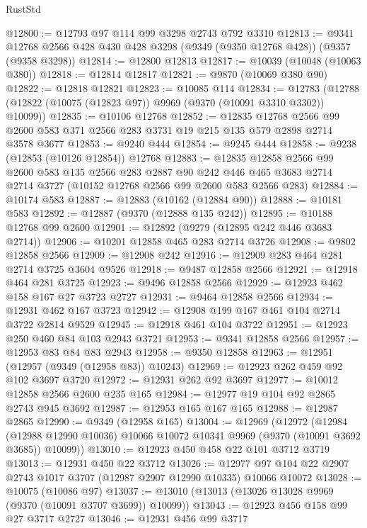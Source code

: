 \begin{lexlean}{RustStd}
\begin{coremodule}
{\begin{coremodule}
{{{{{{{{{{{{{{{{{{{{{{{{{{{{{{{{{{{{{{{@12800 := @12793 @97 @114 @99 @3298 @2743 @792 @3310
@12813 := @9341 @12768 @2566 @428 @430 @428 @3298 (@9349 (@9350 @12768 @428)) (@9357 (@9358 @3298))
@12814 := @12800 @12813
@12817 := @10039 (@10048 (@10063 @380))
@12818 := @12814 @12817
@12821 := @9870 (@10069 @380 @90)
@12822 := @12818 @12821
@12823 := @10085 @114
@12834 := @12783 (@12788 (@12822 (@10075 (@12823 @97)) @9969 (@9370 (@10091 @3310 @3302)) @10099))
@12835 := @10106 @12768
@12852 := @12835
    @12768
    @2566
    @99
    @2600
    @583
    @371
    @2566
    @283
    @3731
    @19
    @215
    @135
    @579
    @2898
    @2714
    @3578
    @3677
@12853 := @9240 @444
@12854 := @9245 @444
@12858 := @9238 (@12853 (@10126 @12854)) @12768
@12883 := @12835
    @12858
    @2566
    @99
    @2600
    @583
    @135
    @2566
    @283
    @2887
    @90
    @242
    @446
    @465
    @3683
    @2714
    @2714
    @3727
    (@10152 @12768 @2566 @99 @2600 @583 @2566 @283)
@12884 := @10174 @583
@12887 := @12883 (@10162 (@12884 @90))
@12888 := @10181 @583
@12892 := @12887 (@9370 (@12888 @135 @242))
@12895 := @10188 @12768 @99 @2600
@12901 := @12892 (@9279 (@12895 @242 @446 @3683 @2714))
@12906 := @10201 @12858 @465 @283 @2714 @3726
@12908 := @9802 @12858 @2566
@12909 := @12908 @242
@12916 := @12909 @283 @464 @281 @2714 @3725 @3604 @9526
@12918 := @9487 @12858 @2566
@12921 := @12918 @464 @281 @3725
@12923 := @9496 @12858 @2566
@12929 := @12923 @462 @158 @167 @27 @3723 @2727
@12931 := @9464 @12858 @2566
@12934 := @12931 @462 @167 @3723
@12942 := @12908 @199 @167 @461 @104 @2714 @3722 @2814 @9529
@12945 := @12918 @461 @104 @3722
@12951 := @12923 @250 @460 @84 @103 @2943 @3721
@12953 := @9341 @12858 @2566
@12957 := @12953 @83 @84 @83 @2943
@12958 := @9350 @12858
@12963 := @12951 (@12957 (@9349 (@12958 @83)) @10243)
@12969 := @12923 @262 @459 @92 @102 @3697 @3720
@12972 := @12931 @262 @92 @3697
@12977 := @10012 @12858 @2566 @2600 @235 @165
@12984 := @12977 @19 @104 @92 @2865 @2743 @945 @3692
@12987 := @12953 @165 @167 @165
@12988 := @12987 @2865
@12990 := @9349 (@12958 @165)
@13004 := @12969
    (@12972
      (@12984
        (@12988 @12990 @10036)
        @10066
        @10072
        @10341
        @9969
        (@9370 (@10091 @3692 @3685))
        @10099))
@13010 := @12923 @450 @458 @22 @101 @3712 @3719
@13013 := @12931 @450 @22 @3712
@13026 := @12977 @97 @104 @22 @2907 @2743 @1017 @3707 (@12987 @2907 @12990 @10335) @10066 @10072
@13028 := @10075 (@10086 @97)
@13037 := @13010 (@13013 (@13026 @13028 @9969 (@9370 (@10091 @3707 @3699)) @10099))
@13043 := @12923 @456 @158 @99 @27 @3717 @2727
@13046 := @12931 @456 @99 @3717
}}}}}}}}}}}}}}}}}}}}}}}}}}}}}}}}}}}}}}}
\end{coremodule}}
\end{coremodule}
\end{lexlean}
